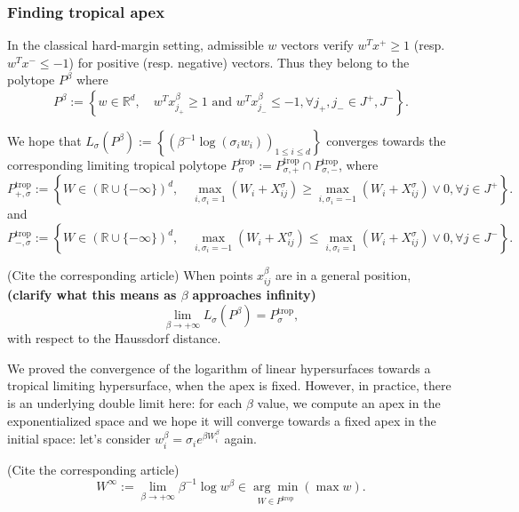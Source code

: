 \subsubsection{Finding tropical apex}

In the classical hard-margin setting, admissible $w$ vectors verify
$w^{T}x^{+}\ge1$ (resp. $w^{T}x^{-}\le-1$) for positive (resp. negative)
vectors. Thus they belong to the polytope $P^{\beta}$ where 
\[
P^{\beta}:=\left\{ w\in\mathbb{R}^{d},\quad w^{T}x_{j_{+}}^{\beta}\ge1\text{ and }w^{T}x_{j_{-}}^{\beta}\le-1,\forall j_{+},j_{-}\in J^{+},J^{-}\right\} .
\]

We hope that $L_{\sigma}(P^{\beta}):=\left\{ (\beta^{-1}\log(\sigma_{i}w_{i}))_{1\le i\le d}\right\} $
converges towards the corresponding limiting tropical polytope $P_{\sigma}^{\text{trop}}:=P_{\sigma,+}^{\text{trop}}\cap P_{\sigma,-}^{\text{trop}}$,
where 
\[
P_{+,\sigma}^{\text{trop}}:=\left\{ W\in(\mathbb{R}\cup\{-\infty\})^{d},\quad\max_{i,\sigma_{i}=1}(W_{i}+X_{ij}^{\sigma})\ge\max_{i,\sigma_{i}=-1}(W_{i}+X_{ij}^{\sigma})\vee0,\forall j\in J^{+}\right\} .
\]
and 
\[
P_{-,\sigma}^{\text{trop}}:=\left\{ W\in(\mathbb{R}\cup\{-\infty\})^{d},\quad\max_{i,\sigma_{i}=-1}(W_{i}+X_{ij}^{\sigma})\le\max_{i,\sigma_{i}=1}(W_{i}+X_{ij}^{\sigma})\vee0,\forall j\in J^{-}\right\} .
\]

\begin{thm}
(Cite the corresponding article) When points $x_{ij}^{\beta}$ are
in a general position, \textbf{(clarify what this means as $\beta$}
\textbf{approaches infinity)} 
\[
\lim_{\beta\rightarrow+\infty}L_{\sigma}(P^{\beta})=P_{\sigma}^{\text{trop}},
\]
with respect to the Haussdorf distance. 
\end{thm}

We proved the convergence of the logarithm of linear hypersurfaces
towards a tropical limiting hypersurface, when the apex is fixed.
However, in practice, there is an underlying double limit here: for
each $\beta$ value, we compute an apex in the exponentialized space
and we hope it will converge towards a fixed apex in the initial space:
let's consider $w_{i}^{\beta}=\sigma_{i}e^{\beta W_{i}^{\beta}}$
again. 
\begin{thm}
(Cite the corresponding article) 
\[
W^{\infty}:=\lim_{\beta\rightarrow+\infty}\beta^{-1}\log w^{\beta}\in\underset{W\in P^{\text{trop}}}{\arg\min}\left(\max w\right).
\]
\end{thm}
